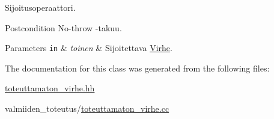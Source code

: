 Sijoitusoperaattori. 

\begin{DoxyPostcond}{Postcondition}
No-\/throw -\/takuu.
\end{DoxyPostcond}

\begin{DoxyParams}[1]{Parameters}
\mbox{\tt in}  & {\em toinen} & Sijoitettava {\ttfamily \hyperlink{class_julkinen_1_1_virhe}{Virhe}}. \\
\hline
\end{DoxyParams}


The documentation for this class was generated from the following files\+:\begin{DoxyCompactItemize}
\item 
\hyperlink{toteuttamaton__virhe_8hh}{toteuttamaton\+\_\+virhe.\+hh}\item 
valmiiden\+\_\+toteutus/\hyperlink{toteuttamaton__virhe_8cc}{toteuttamaton\+\_\+virhe.\+cc}\end{DoxyCompactItemize}

